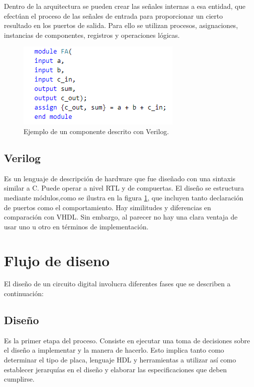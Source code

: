 Dentro de la arquitectura se pueden crear las señales internas a esa entidad, que efectúan el proceso de las señales de entrada para proporcionar un cierto resultado en los puertos de salida. Para ello se utilizan procesos, asignaciones, instancias de componentes, registros y operaciones lógicas.

\begin{figure}
\centering
\includegraphics[scale=.95]{./Figures/verilog_ejemplo.png}
\caption{Ejemplo de un componente descrito con Verilog.}
\label{componente verilog}
\end{figure}

\subsection{Verilog}
Es un lenguaje de descripción de hardware que fue diseñado con una sintaxis similar a C. Puede operar a nivel RTL y de compuertas. El diseño se estructura mediante módulos,como se ilustra en la figura \ref{componente verilog}, que incluyen tanto declaración de puertos como el comportamiento.
Hay similitudes y diferencias en comparación con VHDL. Sin embargo, al parecer no hay una clara ventaja de usar uno u otro en términos de implementación.


\section{Flujo de diseno}
El diseño de un circuito digital involucra diferentes fases que se describen a continuación:

\subsection{Diseño}
Es la primer etapa del proceso. Consiste en ejecutar una toma de decisiones sobre el diseño a implementar y la manera de hacerlo. Esto implica tanto como determinar el tipo de placa, lenguaje HDL y herramientas a utilizar así como establecer jerarquías en el diseño y elaborar las especificaciones que deben cumplirse.


